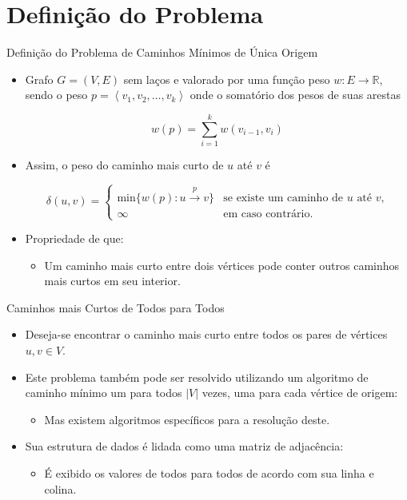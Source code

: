 \documentclass[aspectratio=169]{beamer}
\begin{document}
\section{Definição do Problema}
	\begin{frame}{Definição do Problema de Caminhos Mínimos de Única Origem \cite{cormen2002algoritmos}} 
			
		\begin{itemize}
			\item Grafo $G = (V, E)$ sem laços e valorado por uma função peso $w : E \rightarrow \mathbb{R}$, sendo o peso $p = \left \langle v_{1}, v_{2}, \ldots, v_{k}  \right \rangle$ onde o somatório dos pesos de suas arestas
		
			$$w(p) = \sum_{i=1}^{k} w(v_{i-1}, v_{i})$$
			
			\item Assim, o peso do caminho mais curto de $u$ até $v$ é 
		
			$$
			\delta(u, v) = 
			\begin{cases}
			\text{min}\{w(p):u\xrightarrow{p} v\} & \text{se existe um caminho de } u \text{ até } v\text{,}\\
			\infty & \text{em caso contrário.}
			\end{cases}
			$$
			
			\item Propriedade de que:
			\begin{itemize}
				\item  Um caminho mais curto entre dois vértices pode conter outros caminhos mais curtos em seu interior.
			\end{itemize}
		\end{itemize}
	\end{frame}
	
	
	\begin{frame}{Caminhos mais Curtos de Todos para Todos}
		\begin{itemize}
			\item Deseja-se encontrar o caminho mais curto entre todos os pares de vértices $u,v \in V$. 
			
			\bigskip
			
			\item Este problema também pode ser resolvido utilizando um algoritmo de caminho mínimo um para todos $|V|$ vezes, uma para cada vértice de origem:
			\begin{itemize}
				\item Mas existem algoritmos específicos para a resolução deste.
			\end{itemize}
			
			\bigskip
			
			\item Sua estrutura de dados é lidada como uma matriz de adjacência:
			\begin{itemize}
				\item  É exibido os valores de todos para todos de acordo com sua linha e colina.
			\end{itemize}
		\end{itemize}
	\end{frame}
	
\end{document}
